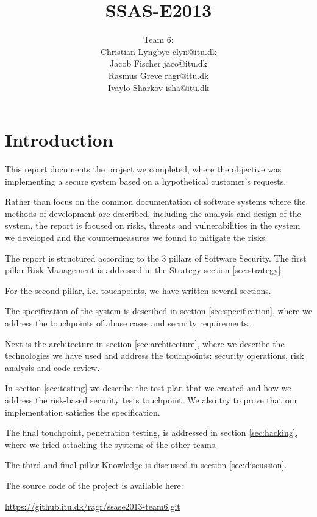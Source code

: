 \documentclass[a4paper]{article}
\title{SSAS-E2013}
\author{Team 6:\\Christian Lyngbye clyn@itu.dk\\Jacob Fischer jaco@itu.dk\\Rasmus Greve ragr@itu.dk\\Ivaylo Sharkov isha@itu.dk}
\begin{document}


\maketitle

\newpage
\tableofcontents

\newpage
\section{Introduction}
This report documents the project we completed, where the objective was implementing a secure system based on a hypothetical customer's requests.

Rather than focus on the common documentation of software systems where the methods of development are described, including the analysis and design of the system, the report is focused on risks, threats and vulnerabilities in the system we developed and the countermeasures we found to mitigate the risks.

The report is structured according to the 3 pillars of Software Security\cite{McGraw2006}. 
The first pillar Risk Management is addressed in the Strategy section \ref{sec:strategy}.

For the second pillar, i.e. touchpoints, we have written several sections.

The specification of the system is described in section \ref{sec:specification}, where we address the touchpoints of abuse cases and security requirements.

Next is the architecture in section \ref{sec:architecture}, where we describe the technologies we have used and address the touchpoints: security operations, risk analysis and code review.

In section \ref{sec:testing} we describe the test plan that we created and how we address the risk-based security tests touchpoint. We also try to prove that our implementation satisfies the specification.

The final touchpoint, penetration testing, is addressed in section \ref{sec:hacking}, where we tried attacking the systems of the other teams. 

The third and final pillar Knowledge is discussed in section \ref{sec:discussion}.

The source code of the project is available here:

\href{https://github.itu.dk/ragr/ssase2013-team6.git}{https://github.itu.dk/ragr/ssase2013-team6.git}
\end{document}
